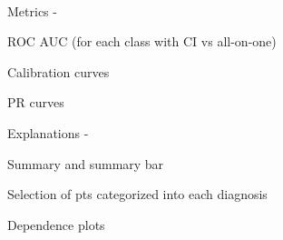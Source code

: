 \beginfigs\

Metrics - 

ROC AUC (for each class with CI vs all-on-one)

Calibration curves

PR curves

Explanations - 

Summary and summary bar

Selection of pts categorized into each diagnosis

Dependence plots  
